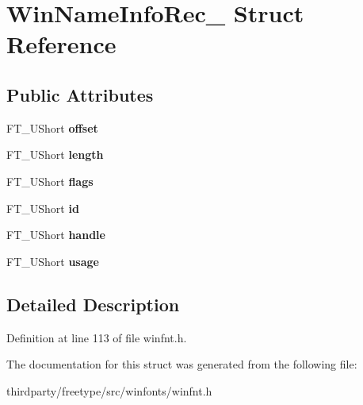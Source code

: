 \hypertarget{struct_win_name_info_rec__}{}\section{Win\+Name\+Info\+Rec\+\_\+ Struct Reference}
\label{struct_win_name_info_rec__}
\subsection*{Public Attributes}
\begin{DoxyCompactItemize}
\item 
\mbox{\label{struct_win_name_info_rec___ac63ab31a4e61ccd3864065ab56bd78e6}} 
F\+T\+\_\+\+U\+Short {\bfseries offset}
\item 
\mbox{\label{struct_win_name_info_rec___aeda4a5eae2a18c36daeeb6a72d8bfbb4}} 
F\+T\+\_\+\+U\+Short {\bfseries length}
\item 
\mbox{\label{struct_win_name_info_rec___addbceb45daa8fd8449679413b13a9267}} 
F\+T\+\_\+\+U\+Short {\bfseries flags}
\item 
\mbox{\label{struct_win_name_info_rec___af961a5491c8d331ca20d9baa5d122148}} 
F\+T\+\_\+\+U\+Short {\bfseries id}
\item 
\mbox{\label{struct_win_name_info_rec___a9f8cbc17f927b8fda21ab4dc539aee7d}} 
F\+T\+\_\+\+U\+Short {\bfseries handle}
\item 
\mbox{\label{struct_win_name_info_rec___ae922346926091cbbbcd7dd551bf7d4d7}} 
F\+T\+\_\+\+U\+Short {\bfseries usage}
\end{DoxyCompactItemize}


\subsection{Detailed Description}


Definition at line 113 of file winfnt.\+h.



The documentation for this struct was generated from the following file\+:\begin{DoxyCompactItemize}
\item 
thirdparty/freetype/src/winfonts/winfnt.\+h\end{DoxyCompactItemize}
